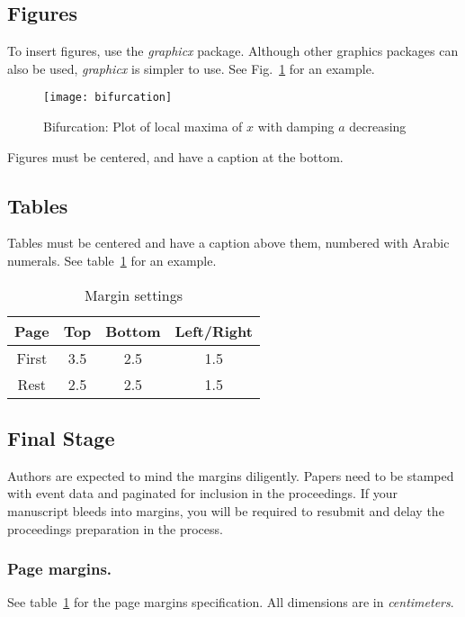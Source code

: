 \documentclass{ifacconf}
\begin{document}
\subsection{Figures}

To insert figures, use the \textit{graphicx} package. Although other
graphics packages can also be used, \textit{graphicx} is simpler to
use. See  Fig.~\ref{fig:bifurcation} for an example.

\begin{figure}
\begin{center}
\texttt{[image: bifurcation]}    %
\caption{Bifurcation: Plot of local maxima of $x$ with damping $a$ decreasing} 
\label{fig:bifurcation}
\end{center}
\end{figure}

Figures must be centered, and have a caption at the bottom. 

\subsection{Tables}
Tables must be centered and have a caption above them, numbered with
Arabic numerals. See table~\ref{tb:margins} for an example.

\begin{table}[hb]
\begin{center}
\caption{Margin settings}\label{tb:margins}
\begin{tabular}{cccc}
Page & Top & Bottom & Left/Right \\\hline
First & 3.5 & 2.5 & 1.5 \\
Rest & 2.5 & 2.5 & 1.5 \\ \hline
\end{tabular}
\end{center}
\end{table}

\subsection{Final Stage}

Authors are expected to mind the margins diligently.  Papers need to
be stamped with event data and paginated for inclusion in the
proceedings. If your manuscript bleeds into margins, you will be
required to resubmit and delay the proceedings preparation in the
process.

\subsubsection{Page margins.} See table~\ref{tb:margins} for the
page margins specification. All dimensions are in \emph{centimeters}.
\end{document}
